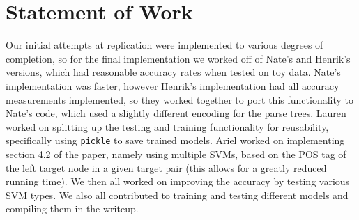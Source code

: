 \documentclass[12pt,fleqn]{article}
\begin{document}
    \section*{Statement of Work}
    Our initial attempts at replication were implemented to various degrees of completion, so for the final implementation we worked off of Nate's and Henrik's versions, which had reasonable accuracy rates when tested on toy data. Nate's implementation was faster, however Henrik's implementation had all accuracy measurements implemented, so they worked together to port this functionality to Nate's code, which used a slightly different encoding for the parse trees. Lauren worked on splitting up the testing and training functionality for reusability, specifically using \texttt{pickle} to save trained models. Ariel worked on implementing section 4.2 of the paper, namely using multiple SVMs, based on the POS tag of the left target node in a given target pair (this allows for a greatly reduced running time). We then all worked on improving the accuracy by testing various SVM types. We also all contributed to training and testing different models and compiling them in the writeup.
\end{document}
